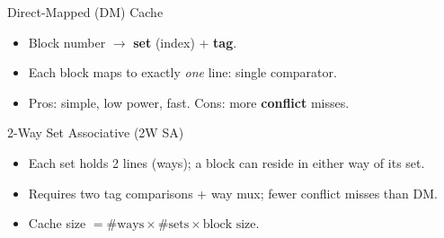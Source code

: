 \documentclass[aspectratio=169,12pt]{beamer}
\begin{document}
\begin{frame}{Direct-Mapped (DM) Cache}
\begin{itemize}
  \item Block number $\rightarrow$ \textbf{set} (index) + \textbf{tag}.
  \item Each block maps to exactly \emph{one} line: single comparator.
  \item Pros: simple, low power, fast. Cons: more \textbf{conflict} misses.
\end{itemize}
\end{frame}

\begin{frame}{2-Way Set Associative (2W SA)}
\begin{itemize}
  \item Each set holds 2 lines (ways); a block can reside in either way of its set.
  \item Requires two tag comparisons + way mux; fewer conflict misses than DM.
  \item Cache size $=\#\text{ways}\times\#\text{sets}\times\text{block size}$.
\end{itemize}
\end{frame}
\end{document}
